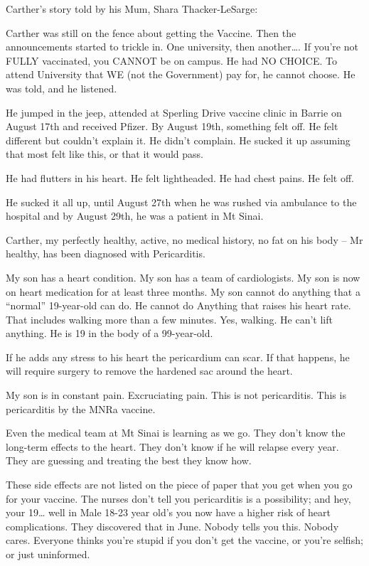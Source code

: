 Carther’s story told by his Mum, Shara Thacker-LeSarge:

Carther was still on the fence about getting the Vaccine. Then the announcements
started to trickle in. One university, then another…. If you’re not FULLY
vaccinated, you CANNOT be on campus. He had NO CHOICE. To attend University that
WE (not the Government) pay for, he cannot choose. He was told, and he listened.

He jumped in the jeep, attended at Sperling Drive vaccine clinic in Barrie on
August 17th and received Pfizer. By August 19th, something felt off. He felt
different but couldn’t explain it. He didn’t complain. He sucked it up assuming
that most felt like this, or that it would pass.

He had flutters in his heart. He felt lightheaded. He had chest pains. He felt
off.

He sucked it all up, until August 27th when he was rushed via ambulance to the
hospital and by August 29th, he was a patient in Mt Sinai.

Carther, my perfectly healthy, active, no medical history, no fat on his body –
Mr healthy, has been diagnosed with Pericarditis.

My son has a heart condition. My son has a team of cardiologists. My son is now
on heart medication for at least three months. My son cannot do anything that a
“normal” 19-year-old can do. He cannot do Anything that raises his heart
rate. That includes walking more than a few minutes. Yes, walking. He can’t lift
anything. He is 19 in the body of a 99-year-old.

If he adds any stress to his heart the pericardium can scar. If that happens, he
will require surgery to remove the hardened sac around the heart.

My son is in constant pain. Excruciating pain. This is not pericarditis. This is
pericarditis by the MNRa vaccine.

Even the medical team at Mt Sinai is learning as we go. They don’t know the
long-term effects to the heart. They don’t know if he will relapse every
year. They are guessing and treating the best they know how.

These side effects are not listed on the piece of paper that you get when you go
for your vaccine. The nurses don’t tell you pericarditis is a possibility; and
hey, your 19… well in Male 18-23 year old’s you now have a higher risk of heart
complications. They discovered that in June. Nobody tells you this. Nobody
cares. Everyone thinks you’re stupid if you don’t get the vaccine, or you’re
selfish; or just uninformed.

